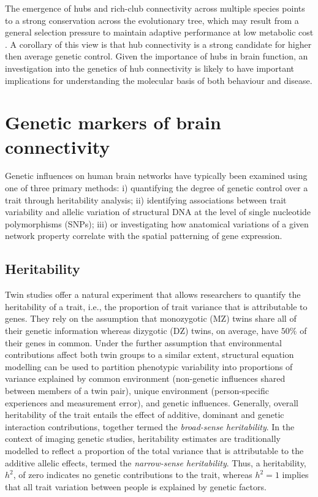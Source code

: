 The emergence of hubs and rich-club connectivity across multiple species points to a strong conservation across the evolutionary tree, which may result from a general selection pressure to maintain adaptive performance at low metabolic cost \citep{Bullmore2012}. A corollary of this view is that hub connectivity is a strong candidate for higher then average genetic control. Given the importance of hubs in brain function, an investigation into the genetics of hub connectivity is likely to have important implications for understanding the molecular basis of both behaviour and disease.
\section{Genetic markers of brain connectivity}

Genetic influences on human brain networks have typically been examined using one of three primary methods: i) quantifying the degree of genetic control over a trait through heritability analysis; ii) identifying associations between trait variability and allelic variation of structural DNA at the level of single nucleotide polymorphisms (SNPs); iii) or investigating how anatomical variations of a given network property correlate with the spatial patterning of gene expression.

\subsection{Heritability}

Twin studies offer a natural experiment that allows researchers to quantify the heritability of a trait, i.e., the proportion of trait variance that is attributable to genes. They rely on the assumption that monozygotic (MZ) twins share all of their genetic information whereas dizygotic (DZ) twins, on average, have $50\%$ of their genes in common. Under the further assumption that environmental contributions affect both twin groups to a similar extent, structural equation modelling can be used to partition phenotypic variability into proportions of variance explained by common environment (non-genetic influences shared between members of a twin pair), unique environment (person-specific experiences and measurement error), and genetic influences. Generally, overall heritability of the trait entails the effect of additive, dominant and genetic interaction contributions, together termed the \textit{broad-sense heritability}. In the context of imaging genetic studies, heritability estimates are traditionally modelled to reflect a proportion of the total variance that is attributable to the additive allelic effects, termed the \textit{narrow-sense heritability}. Thus, a heritability, $h^{2}$, of zero indicates no genetic contributions to the trait, whereas $h^{2}=1$ implies that all trait variation between people is explained by genetic factors.

